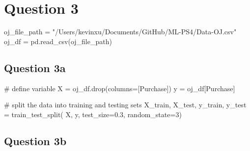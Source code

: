 \documentclass[
  letterpaper,
  DIV=11,
  numbers=noendperiod]{scrartcl}
\newenvironment{Shaded}{\begin{snugshade}}{\end{snugshade}}
\newcommand{\CommentTok}[1]{\textcolor[rgb]{0.37,0.37,0.37}{#1}}
\newcommand{\DecValTok}[1]{\textcolor[rgb]{0.68,0.00,0.00}{#1}}
\newcommand{\FloatTok}[1]{\textcolor[rgb]{0.68,0.00,0.00}{#1}}
\newcommand{\NormalTok}[1]{\textcolor[rgb]{0.00,0.23,0.31}{#1}}
\newcommand{\OperatorTok}[1]{\textcolor[rgb]{0.37,0.37,0.37}{#1}}
\newcommand{\StringTok}[1]{\textcolor[rgb]{0.13,0.47,0.30}{#1}}
\begin{document}
\section{Question 3}\label{question-3}

\begin{Shaded}
\begin{Highlighting}[]
\NormalTok{oj\_file\_path }\OperatorTok{=} \StringTok{"/Users/kevinxu/Documents/GitHub/ML{-}PS4/Data{-}OJ.csv"}
\NormalTok{oj\_df }\OperatorTok{=}\NormalTok{ pd.read\_csv(oj\_file\_path)}
\end{Highlighting}
\end{Shaded}

\subsection{Question 3a}\label{question-3a}

\begin{Shaded}
\begin{Highlighting}[]
\CommentTok{\# define variable}
\NormalTok{X }\OperatorTok{=}\NormalTok{ oj\_df.drop(columns}\OperatorTok{=}\NormalTok{[}\StringTok{\textquotesingle{}Purchase\textquotesingle{}}\NormalTok{])}
\NormalTok{y }\OperatorTok{=}\NormalTok{ oj\_df[}\StringTok{\textquotesingle{}Purchase\textquotesingle{}}\NormalTok{]}

\CommentTok{\# split the data into training and testing sets}
\NormalTok{X\_train, X\_test, y\_train, y\_test }\OperatorTok{=}\NormalTok{ train\_test\_split(}
\NormalTok{    X, y, test\_size}\OperatorTok{=}\FloatTok{0.3}\NormalTok{, random\_state}\OperatorTok{=}\DecValTok{3}\NormalTok{)}
\end{Highlighting}
\end{Shaded}

\subsection{Question 3b}\label{question-3b}
\end{document}
